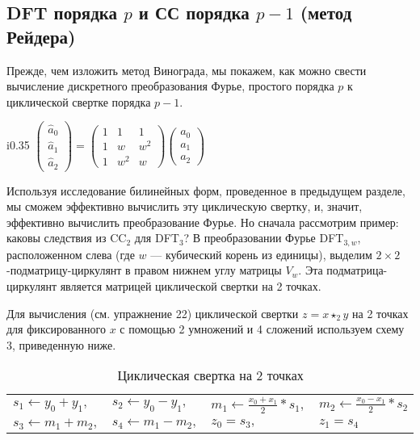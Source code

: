 \documentclass{mai_book}
\begin{document}
\subsection{DFT порядка $p$ и СС порядка $p - 1$ (метод Рейдера)}
Прежде, чем изложить метод Винограда, мы покажем, как можно свести вычисление дискретного преобразования Фурье, простого порядка $p$ к циклической свертке порядка $p - 1$.\par
\begin{wrapfigure}{i}{0.35\textwidth}
$\begin{pmatrix} \hat{a}_0 \\ \hat{a}_1 \\ \hat{a}_2 \end{pmatrix} = \begin{pmatrix} 1 & 1 & 1 \\ 1 & w & w^2 \\ 1 & w^2 & w \end{pmatrix} \begin{pmatrix} a_0 \\ a_1 \\ a_2 \end{pmatrix}$
  \end{wrapfigure}
Используя исследование билинейных форм, проведенное в предыдущем разделе, мы сможем эффективно вычислить эту циклическую свертку, и, значит, эффективно вычислить преобразование Фурье. Но сначала рассмотрим пример: каковы следствия из C{\footnotesize C}$_2$ для D{\footnotesize FT}$_3$? В преобразовании Фурье D{\footnotesize FT}$_{3,w}$, расположенном слева (где $w$ --- кубический корень из единицы), выделим $2 \times 2$-подматрицу-циркулянт в правом нижнем углу матрицы $V_w$. Эта подматрица-циркулянт является матрицей циклической свертки на 2 точках.\par 
Для вычисления (см. упражнение 22) циклической свертки $z = x \star_2y$ на 2 точках для фиксированного $x$ с помощью 2 умножений и 4 сложений используем схему 3, приведенную ниже.\par
\begin{table}[h!]
  \begin{center}
\begin{tabular}{|llll|}
  \hline
  $s_1 \leftarrow y_0+y_1,$ & $s_2 \leftarrow y_0-y_1,$ & $m_1 \leftarrow \frac{x_0+x_1}{2} * s_1,$ & $m_2 \leftarrow \frac{x_0-x_1}{2} * s_2$
  \\
  $s_3 \leftarrow m_1 + m_2,$ & $s_4 \leftarrow m_1-m_2,$ & $z_0=s_3,$ & $z_1=s_4$
  \\
  \hline
\end{tabular}
\caption{Циклическая свертка на 2 точках}
  \end{center}
  \end{table}
\end{document}
